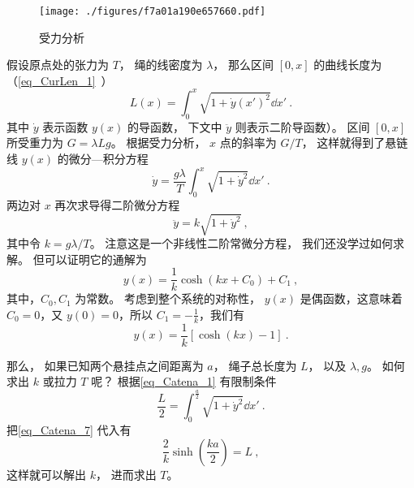 \begin{figure}[ht]
\centering
\texttt{[image: ./figures/f7a01a190e657660.pdf]}
\caption{受力分析} \label{fig_Catena_2}
\end{figure}
假设原点处的张力为 $T$， 绳的线密度为 $\lambda$， 那么区间 $[0, x]$ 的曲线长度为（\autoref{eq_CurLen_1}~）
\begin{equation}\label{eq_Catena_1}
L(x) = \int_0^x \sqrt{1 + \dot y(x')^2} \dd{x'}~.
\end{equation}
其中 $\dot y$ 表示函数 $y(x)$ 的导函数， 下文中 $\ddot y$ 则表示二阶导函数）。 区间 $[0, x]$ 所受重力为 $G = \lambda L g$。 根据受力分析， $x$ 点的斜率为 $G/T$， 这样就得到了悬链线 $y(x)$ 的微分—积分方程
\begin{equation}
\dot y = \frac{g\lambda}{T} \int_0^x \sqrt{1 + \dot y^2} \dd{x'}~.
\end{equation}
两边对 $x$ 再次求导得二阶微分方程
\begin{equation}
\ddot y = k \sqrt{1 + \dot y^2}~,
\end{equation}
其中令 $k = g\lambda/T$。 注意这是一个非线性二阶常微分方程， 我们还没学过如何求解。 但可以证明它的通解为
\begin{equation}\label{eq_Catena_2}
y(x) = \frac{1}{k}\cosh(kx+C_0)+C_1~,
\end{equation}
其中，$C_0,C_1$ 为常数。
考虑到整个系统的对称性， $y(x)$ 是偶函数，这意味着 $C_0=0$，又 $y(0)=0$，所以 $C_1=-\frac{1}{k}$，我们有
\begin{equation}\label{eq_Catena_7}
y(x)=\frac{1}{k}[\cosh(kx)-1]~.
\end{equation}

那么， 如果已知两个悬挂点之间距离为 $a$， 绳子总长度为 $L$， 以及 $\lambda, g$。 如何求出 $k$ 或拉力 $T$ 呢？ 根据\autoref{eq_Catena_1} 有限制条件
\begin{equation}
\frac{L}{2} = \int_{0}^{\frac{a}{2}} \sqrt{1 + \dot y^2} \dd{x'}~.
\end{equation}
把\autoref{eq_Catena_7} 代入有
\begin{equation}
\frac{2}{k}\sinh(\frac{ka}{2}) = L~,
\end{equation}
这样就可以解出 $k$， 进而求出 $T$。

